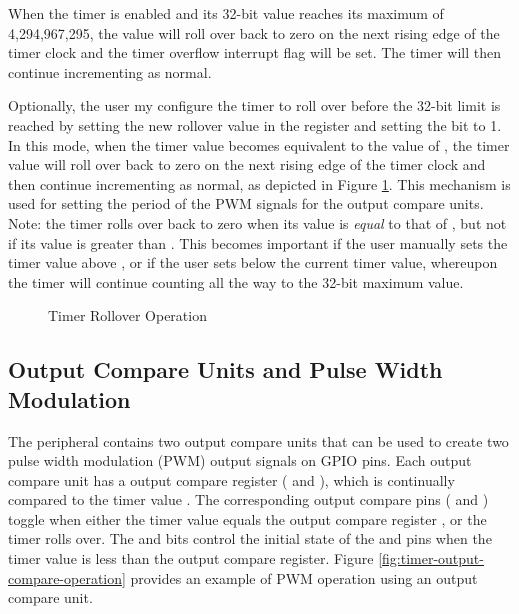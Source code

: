 When the timer is enabled and its 32-bit value reaches its maximum of 4,294,967,295, the value will roll over back to zero on the next rising edge of the timer clock and the timer overflow interrupt flag  will be set. The timer will then continue incrementing as normal.

Optionally, the user my configure the timer to roll over before the 32-bit limit is reached by setting the new rollover value in the  register and setting the  bit to 1. In this mode, when the timer value becomes equivalent to the value of , the timer value will roll over back to zero on the next rising edge of the timer clock and then continue incrementing as normal, as depicted in Figure \ref{fig:timer-rollover-operation}. This mechanism is used for setting the period of the PWM signals for the output compare units. Note: the timer rolls over back to zero when its value is \textit{equal} to that of , but not if its value is greater than . This becomes important if the user manually sets the timer value above , or if the user sets  below the current timer value, whereupon the timer will continue counting all the way to the 32-bit maximum value.

\begin{figure}[htpb]
	
	\caption{Timer Rollover Operation}
	\label{fig:timer-rollover-operation}
\end{figure}




\subsection{Output Compare Units and Pulse Width Modulation}

The  peripheral contains two output compare units that can be used to create two pulse width modulation (PWM) output signals on GPIO pins. Each output compare unit has a output compare register ( and ), which is continually compared to the timer value . The corresponding output compare pins ( and ) toggle when either the timer value  equals the output compare register , or the timer rolls over. The  and  bits control the initial state of the  and  pins when the timer value is less than the output compare register. Figure \ref{fig:timer-output-compare-operation} provides an example of PWM operation using an output compare unit.

